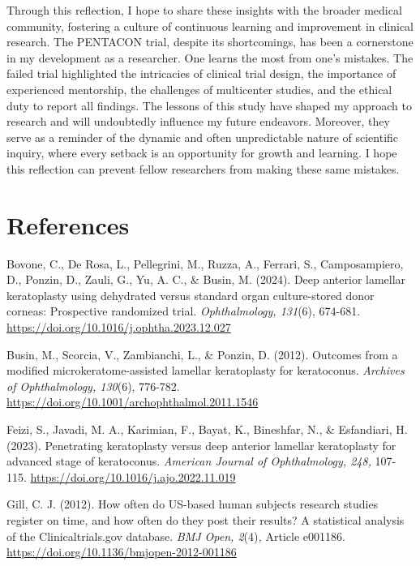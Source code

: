 \documentclass[authordate, reflection]{jote-new-article}
\begin{document}
	Through this reflection, I hope to share these insights with the broader medical community, fostering a culture of continuous learning and improvement in clinical research. The PENTACON trial, despite its shortcomings, has been a cornerstone in my development as a researcher. One learns the most from one's mistakes. The failed trial highlighted the intricacies of clinical trial design, the importance of experienced mentorship, the challenges of multicenter studies, and the ethical duty to report all findings. The lessons of this study have shaped my approach to research and will undoubtedly influence my future endeavors. Moreover, they serve as a reminder of the dynamic and often unpredictable nature of scientific inquiry, where every setback is an opportunity for growth and learning. I hope this reflection can prevent fellow researchers from making these same mistakes.



	\section{References}



	Bovone, C., De Rosa, L., Pellegrini, M., Ruzza, A., Ferrari, S., Camposampiero, D., Ponzin, D., Zauli, G., Yu, A. C., \& Busin, M. (2024). Deep anterior lamellar keratoplasty using dehydrated versus standard organ culture-stored donor corneas: Prospective randomized trial. \emph{Ophthalmology, 131}(6), 674-681. \url{https://doi.org/10.1016/j.ophtha.2023.12.027}



	Busin, M., Scorcia, V., Zambianchi, L., \& Ponzin, D. (2012). Outcomes from a modified microkeratome-assisted lamellar keratoplasty for keratoconus. \emph{Archives of Ophthalmology, 130}(6), 776-782. \url{https://doi.org/10.1001/archophthalmol.2011.1546}



	Feizi, S., Javadi, M. A., Karimian, F., Bayat, K., Bineshfar, N., \& Esfandiari, H. (2023). Penetrating keratoplasty versus deep anterior lamellar keratoplasty for advanced stage of keratoconus. \emph{American Journal of Ophthalmology, 248, }107-115. \url{https://doi.org/10.1016/j.ajo.2022.11.019}



	Gill, C. J. (2012). How often do US-based human subjects research studies register on time, and how often do they post their results? A statistical analysis of the Clinicaltrials.gov database. \emph{BMJ Open, 2}(4)\emph{, }Article e001186. \url{https://doi.org/10.1136/bmjopen-2012-001186}
\end{document}
